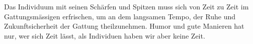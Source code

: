Das Individuum mit seinen Schärfen und Spitzen muss sich von Zeit zu Zeit im Gattungsmässigen erfrischen, um an dem langsamen Tempo, der Ruhe und Zukunftsicherheit der Gattung theilzunehmen. Humor und gute Manieren hat nur, wer sich Zeit lässt, als Individuen haben wir aber keine Zeit.
\par

